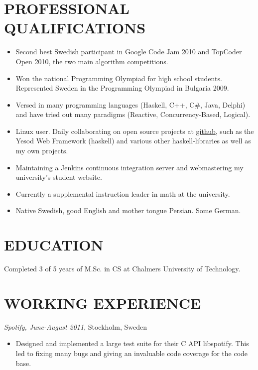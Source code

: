 \documentclass[11pt]{res} %
\begin{document}
\begin{resume}

\section{PROFESSIONAL QUALIFICATIONS}
   \begin{itemize} %
   \item Second best Swedish participant in
    Google Code Jam 2010 and TopCoder Open 2010,
    the two main algorithm competitions.
   \item Won the national Programming Olympiad for high school students.
    Represented Sweden in the Programming Olympiad in Bulgaria 2009.
   \item Versed in many programming languages (Haskell, C++, C\#, Java, Delphi)
    and have tried out many paradigms
    (Reactive, Concurrency-Based, Logical).
   \item Linux user. Daily collaborating on open source projects
    at \href{https://github.com/Tarrasch}{github},
    such as the Yesod Web Framework (haskell) and
    various other haskell-libraries as well as my own projects.
   \item Maintaining a Jenkins continuous integration server
    and webmastering my university's student website.
   \item Currently a supplemental instruction leader in math at the university.
   \item Native Swedish, good English and mother tongue Persian. Some German.
 \end{itemize}

\section{EDUCATION}
 \noindent Completed 3 of 5 years of M.Sc. in CS
  at Chalmers University of Technology.

\section{WORKING EXPERIENCE}
\emph{Spotify, June-August 2011}, Stockholm, Sweden
\vspace{0.2in}
   \begin{itemize} %
   \item Designed and implemented a large test
    suite for their C API libspotify.
    This led to fixing many bugs and giving an
    invaluable code coverage for the code base.
 \end{itemize}



\end{resume}
\end{document}
